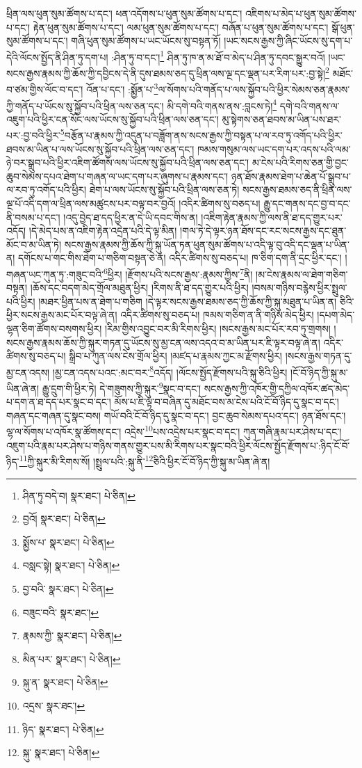 ཕྲིན་ལས་ཕུན་སུམ་ཚོགས་པ་དང་། ཕན་འདོགས་པ་ཕུན་སུམ་ཚོགས་པ་དང་། འཇིགས་པ་མེད་པ་ཕུན་སུམ་ཚོགས་པ་དང་། རྟེན་ཕུན་སུམ་ཚོགས་པ་དང་། ལམ་ཕུན་སུམ་ཚོགས་པ་དང་། བཞོན་པ་ཕུན་སུམ་ཚོགས་པ་དང་། སྒོ་ཕུན་སུམ་ཚོགས་པ་དང་། གཞི་ཕུན་སུམ་ཚོགས་པ་ཡང་ཡོངས་སུ་བསྟན་ཏོ། །ཡང་སངས་རྒྱས་ཀྱི་ཞིང་ཡོངས་སུ་དག་པ་དེའི་ལོངས་སྤྱོད་ནི་ཤིན་ཏུ་དག་པ། :ཤིན་ཏུ་བ་དང་།\footnote{ཤིན་ཏུ་བདེ་བ།  སྣར་ཐང་།  པེ་ཅིན། } ཤིན་ཏུ་ཁ་ན་མ་ཐོ་བ་མེད་པ་ཤིན་ཏུ་དབང་སྒྱུར་བའོ། །ཡང་སངས་རྒྱས་རྣམས་ཀྱི་ཆོས་ཀྱི་དབྱིངས་དེ་ནི་དུས་ཐམས་ཅད་དུ་ཕྲིན་ལས་ལྔ་དང་ལྡན་པར་རིག་པར་:བྱ་སྟེ།\footnote{བྱའོ།  སྣར་ཐང་།  པེ་ཅིན། } མཐོང་བ་ཙམ་གྱིས་ལོང་བ་དང་། འོན་པ་དང་། :སྨྱོན་པ་\footnote{སྨྱོས་པ་  སྣར་ཐང་།  པེ་ཅིན། }ལ་སོགས་པའི་གནོད་པ་ལས་སྐྱོབ་པའི་ཕྱིར་སེམས་ཅན་རྣམས་ཀྱི་གནོད་པ་ཡོངས་སུ་སྐྱོབ་པའི་ཕྲིན་ལས་ཅན་དང་། མི་དགེ་བའི་གནས་ནས་:བླངས་ཏེ།\footnote{བསླང་སྟེ།  སྣར་ཐང་།  པེ་ཅིན། } དགེ་བའི་གནས་ལ་འཇུག་པའི་ཕྱིར་ངན་སོང་ལས་ཡོངས་སུ་སྐྱོབ་པའི་ཕྲིན་ལས་ཅན་དང་། མུ་སྟེགས་ཅན་ཐབས་མ་ཡིན་པས་ཐར་པར་:བྱ་བའི་ཕྱིར་\footnote{བྱ་བའི་  སྣར་ཐང་།  པེ་ཅིན། }བརྩོན་པ་རྣམས་ཀྱི་འདུན་པ་བཟློག་ནས་སངས་རྒྱས་ཀྱི་བསྟན་པ་ལ་རབ་ཏུ་འགོད་པའི་ཕྱིར་ཐབས་མ་ཡིན་པ་ལས་ཡོངས་སུ་སྐྱོབ་པའི་ཕྲིན་ལས་ཅན་དང་། ཁམས་གསུམ་ལས་ཡང་དག་པར་འདས་པའི་ལམ་ཉེ་བར་སྒྲུབ་པའི་ཕྱིར་འཇིག་ཚོགས་ལས་ཡོངས་སུ་སྐྱོབ་པའི་ཕྲིན་ལས་ཅན་དང་། མ་ངེས་པའི་རིགས་ཅན་གྱི་བྱང་ཆུབ་སེམས་དཔའ་ཐེག་པ་གཞན་ལ་ཡང་དག་པར་ཞུགས་པ་རྣམས་དང་། ཉན་ཐོས་རྣམས་ཐེག་པ་ཆེན་པོ་སྒྲུབ་པ་ལ་རབ་ཏུ་འགོད་པའི་ཕྱིར། ཐེག་པ་ལས་ཡོངས་སུ་སྐྱོབ་པའི་ཕྲིན་ལས་ཅན་ཏེ། སངས་རྒྱས་ཐམས་ཅད་ནི་ཕྲིན་ལས་ལྔ་པོ་འདི་དག་ལ་ཕྲིན་ལས་མཚུངས་པར་བལྟ་བར་བྱའོ། །འདིར་ཚིགས་སུ་བཅད་པ། རྒྱུ་དང་གནས་དང་བྱ་བ་དང་ནི་བསམ་པ་དང་། །འདུ་བྱེད་ཐ་དད་ཕྱིར་ན་དེ་ཡི་དབང་གིས་ན། །འཇིག་རྟེན་རྣམས་ཀྱི་ལས་ནི་ཐ་དད་གྱུར་པར་འདོད། །དེ་མེད་པས་ན་འཇིག་རྟེན་འདྲེན་པའི་དེ་ལྟ་མིན། །གལ་ཏེ་དེ་ལྟར་ཉན་ཐོས་དང་རང་སངས་རྒྱས་དང་ཐུན་མོང་བ་མ་ཡིན་ཏེ། སངས་རྒྱས་རྣམས་ཀྱི་ཆོས་ཀྱི་སྐུ་ཡོན་ཏན་ཕུན་སུམ་ཚོགས་པ་འདི་ལྟ་བུ་འདི་དང་ལྡན་པ་ཡིན་ན། དགོངས་པ་གང་གིས་ཐེག་པ་གཅིག་བསྟན་ཅེ་ན། འདིར་ཚིགས་སུ་བཅད་པ། ཁ་ཅིག་དག་ནི་དྲང་ཕྱིར་དང་། །གཞན་ཡང་ཀུན་ཏུ་:གཟུང་བའི་\footnote{བཟུང་བའི་  སྣར་ཐང་། }ཕྱིར། །རྫོགས་པའི་སངས་རྒྱས་:རྣམས་ཀྱིས་\footnote{རྣམས་ཀྱི་  སྣར་ཐང་།  པེ་ཅིན། }ནི། །མ་ངེས་རྣམས་ལ་ཐེག་གཅིག་བསྟན། །ཆོས་དང་བདག་མེད་གྲོལ་མཐུན་ཕྱིར། །རིགས་ནི་ཐ་དད་གྱུར་པའི་ཕྱིར། །བསམ་གཉིས་བརྙེས་ཕྱིར་སྤྲུལ་པའི་ཕྱིར། །མཐར་ཕྱིན་པས་ན་ཐེག་པ་གཅིག །དེ་ལྟར་སངས་རྒྱས་ཐམས་ཅད་ཀྱི་ཆོས་ཀྱི་སྐུ་མཐུན་པ་ཡིན་ན། ཅིའི་ཕྱིར་སངས་རྒྱས་མང་པོར་བལྟ་ཞེ་ན། འདིར་ཚིགས་སུ་བཅད་པ། ཁམས་གཅིག་ན་ནི་གཉིས་མེད་ཕྱིར། །དཔག་མེད་ལྷན་ཅིག་ཚོགས་བསགས་ཕྱིར། །རིམ་གྱིས་འབྱུང་བར་མི་རིགས་ཕྱིར། །སངས་རྒྱས་མང་པོར་རབ་ཏུ་གྲགས། །སངས་རྒྱས་རྣམས་ཆོས་ཀྱི་སྐུར་གཏན་དུ་ཡོངས་སུ་མྱ་ངན་ལས་འདའ་བ་མ་ཡིན་པར་ཇི་ལྟར་བལྟ་ཞེ་ན། འདིར་ཚིགས་སུ་བཅད་པ། སྒྲིབ་པ་ཀུན་ལས་ངེས་གྲོལ་ཕྱིར། །མཛད་པ་རྣམས་ཀྱང་མ་རྫོགས་ཕྱིར། །སངས་རྒྱས་གཏན་དུ་མྱ་ངན་འདས། །མྱ་ངན་འདས་པའང་:མང་བར་\footnote{མིན་པར་  སྣར་ཐང་།  པེ་ཅིན། }འདོད། །ལོངས་སྤྱོད་རྫོགས་པའི་སྐུ་ཅིའི་ཕྱིར། །ངོ་བོ་ཉིད་ཀྱི་སྐུ་མ་ཡིན་ཞེ་ན། རྒྱུ་དྲུག་གི་ཕྱིར་ཏེ། དེ་གཟུགས་ཀྱི་སྐུར་\footnote{སྐུ་ན་  སྣར་ཐང་།  པེ་ཅིན། }སྣང་བ་དང་། སངས་རྒྱས་ཀྱི་འཁོར་གྱི་དཀྱིལ་འཁོར་ཚད་མེད་པ་དག་ན་ཐ་དད་པར་སྣང་བ་དང་། མོས་པ་ཇི་ལྟ་བ་བཞིན་དུ་མཐོང་བས་མ་ངེས་པའི་ངོ་བོ་ཉིད་དུ་སྣང་བ་དང་། གཞན་དང་གཞན་དུ་སྣང་བས། གཡོ་བའི་ངོ་བོ་ཉིད་དུ་སྣང་བ་དང་། བྱང་ཆུབ་སེམས་དཔའ་དང་། ཉན་ཐོས་དང་། ལྷ་ལ་སོགས་པ་འཁོར་སྣ་ཚོགས་དང་། འདྲེས་\footnote{འདྲས་  སྣར་ཐང་། }པས་འདྲེས་པར་སྣང་བ་དང་། ཀུན་གཞི་རྣམ་པར་ཤེས་པ་དང་། འཇུག་པའི་རྣམ་པར་ཤེས་པ་གཉིས་གནས་གྱུར་པས་མི་རིགས་པར་སྣང་བའི་ཕྱིར་ལོངས་སྤྱོད་རྫོགས་པ་:ཉིད་ངོ་བོ་ཉིད་\footnote{ཉིད་  སྣར་ཐང་།  པེ་ཅིན། }ཀྱི་སྐུར་མི་རིགས་སོ། །སྤྲུལ་པའི་:སྐུ་ནི་\footnote{སྐུ་  སྣར་ཐང་།  པེ་ཅིན། }ཅིའི་ཕྱིར་ངོ་བོ་ཉིད་ཀྱི་སྐུ་མ་ཡིན་ཞེ་ན། 